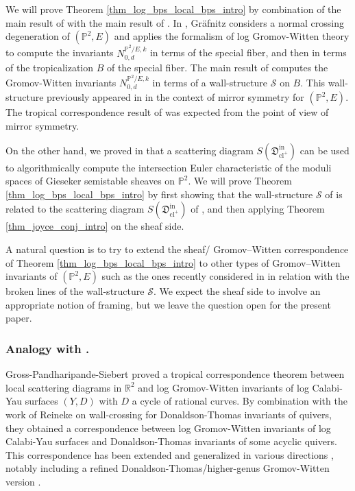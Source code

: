 \documentclass[11pt,letterpaper]{amsart}
\newcommand\PP{\mathbb P}
\newcommand\R{\mathbb R}
\newcommand\fD{\mathfrak D}
\newcommand\cl{\operatorname{cl}}
\newcommand\iin{\mathrm{in}}
\begin{document}
We will prove
Theorem \ref{thm_log_bps_local_bps_intro} by combination of the main result of \cite{gabele2019tropical} with the main result of \cite{bousseau2019scattering}.
In \cite{gabele2019tropical}, Gr\"afnitz considers a normal crossing degeneration of 
$(\PP^2,E)$ and applies the formalism of log Gromov-Witten theory 
\cite{MR3011419, MR3224717, MR3257836, abramovich2017decomposition} to compute the invariants $N_{0,d}^{\PP^2/E,k}$ in terms of the special fiber, and then in terms of the tropicalization $B$ of the special fiber. 
The main result of \cite{gabele2019tropical} computes the Gromov-Witten invariants $N_{0,d}^{\PP^2/E,k}$ in terms of a wall-structure $\mathcal{S}$ on $B$. This wall-structure previously appeared in \cite[Example 2.4]{cps} in the context of mirror symmetry for $(\PP^2,E)$. The tropical correspondence result of \cite{gabele2019tropical} was expected from the point of view of mirror symmetry.

On the other hand, we proved  in \cite{bousseau2019scattering} that a scattering diagram $S(\fD^\iin_{\cl^+})$ can be used to algorithmically compute the intersection Euler characteristic of the moduli spaces of Gieseker semistable sheaves on $\PP^2$.
We will prove Theorem \ref{thm_log_bps_local_bps_intro} by
first showing that the wall-structure $\mathcal{S}$ of 
\cite{gabele2019tropical} is related to the scattering diagram 
$S(\fD^\iin_{\cl^+})$ of \cite{bousseau2019scattering}, and then applying Theorem \ref{thm_joyce_conj_intro}
on the sheaf side.

A natural question is to try to extend the sheaf/ Gromov--Witten correspondence of Theorem \ref{thm_log_bps_local_bps_intro} to other types of Gromov--Witten invariants of $(\PP^2,E)$ such as the ones recently considered in \cite{grafnitz2022proper} in relation with the broken lines of the wall-structure $\mathcal{S}$. 
We expect the sheaf side to involve an appropriate notion of framing, but we leave the question open for the present paper.

\subsubsection{Analogy with \cite{MR2667135, MR2662867, bousseau2018quantum_tropical}.}
Gross-Pandharipande-Siebert \cite{MR2667135} proved a tropical correspondence theorem
 between local scattering diagrams in $\R^2$ and log Gromov-Witten invariants 
 of log Calabi-Yau surfaces $(Y,D)$ with $D$ a cycle of rational curves.
By combination with the work of Reineke \cite{MR2801406, MR2650811} on wall-crossing for Donaldson-Thomas invariants of quivers,
they obtained a correspondence between log Gromov-Witten invariants 
of log Calabi-Yau surfaces and Donaldson-Thomas invariants of some acyclic quivers.
This correspondence has been extended and generalized in various directions
\cite{MR2662867, MR3004575, MR3033514, MR3383167}, notably including a refined Donaldson-Thomas/higher-genus Gromov-Witten version \cite{MR3904449, bousseau2018quantum_tropical}.
\end{document}
